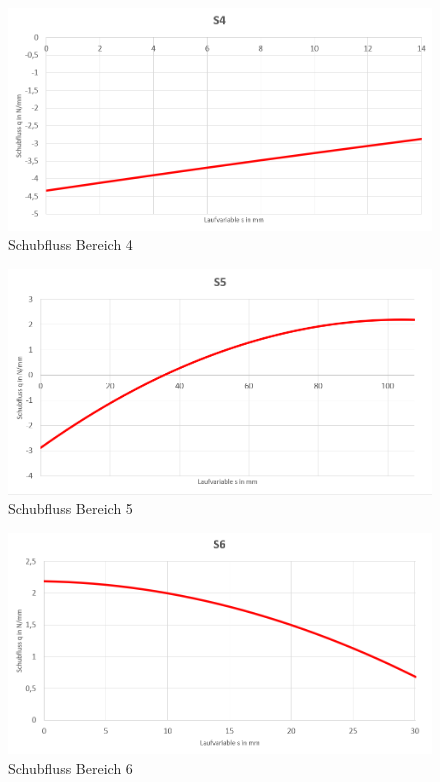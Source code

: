 \begin{figure}[h]
	\includegraphics[width=1.0\textwidth]{Bilder/S4.png}
	\caption{Schubfluss Bereich 4}
	\label{fig:S4}
\end{figure}
\begin{figure}[h]
	\includegraphics[width=1.0\textwidth]{Bilder/S5.png}
	\caption{Schubfluss Bereich 5}
\end{figure}
\begin{figure}[h]
	\includegraphics[width=1.0\textwidth]{Bilder/S6.png}
	\caption{Schubfluss Bereich 6}
\end{figure}
